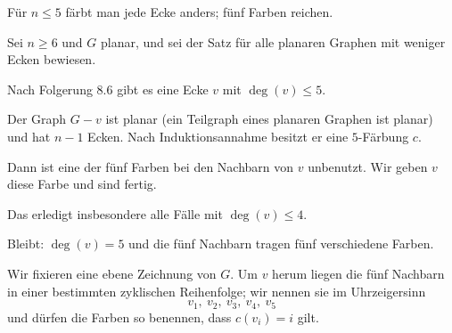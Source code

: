 \begin{merksatz}
Für $n \le 5$ färbt man jede Ecke anders; fünf Farben reichen.

Sei $n \ge 6$ und $G$ planar, und sei der Satz für alle planaren Graphen mit weniger Ecken bewiesen.

Nach Folgerung 8.6 gibt es eine Ecke $v$ mit $\deg(v) \le 5$.

Der Graph $G - v$ ist planar (ein Teilgraph eines planaren Graphen ist planar) und hat $n-1$ Ecken. Nach Induktionsannahme besitzt er eine $5$-Färbung $c$.

Dann ist eine der fünf Farben bei den Nachbarn von $v$ unbenutzt. Wir geben $v$ diese Farbe und sind fertig.

Das erledigt insbesondere alle Fälle mit $\deg(v) \le 4$.

Bleibt: $\deg(v) = 5$ und die fünf Nachbarn tragen fünf verschiedene Farben.

Wir fixieren eine ebene Zeichnung von $G$. Um $v$ herum liegen die fünf Nachbarn in einer bestimmten zyklischen Reihenfolge; wir nennen sie im Uhrzeigersinn
\[ v_1,\ v_2,\ v_3,\ v_4,\ v_5 \]
und dürfen die Farben so benennen, dass $c(v_i) = i$ gilt.

\begin{center}
\end{center}
\end{merksatz}

